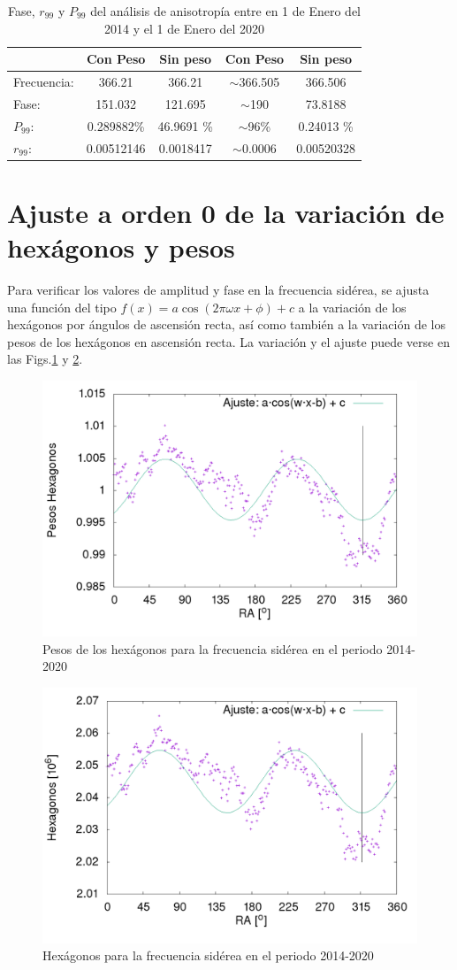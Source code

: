\begin{table}[H]
\centering
\begin{tabular}{l|c|c|c|c}
				& Con Peso 		& Sin peso 		& Con Peso 		& Sin peso 		\\ \hline
Frecuencia:		& 366.21 		& 366.21 		& $\sim$366.505 & 366.506 		\\
Fase:			& 151.032 		& 121.695		& $\sim$190 	& 73.8188		\\
$P_{99}$:		& 0.289882\%	& 46.9691 \% 	& $\sim$96\%	& 0.24013 \% 	\\
$r_{99}$:		& 0.00512146	& 0.0018417		& $\sim$0.0006	& 0.00520328	\\
\end{tabular}
\caption{Fase, $r_{99}$ y $P_{99}$ del análisis de anisotropía entre en 1 de Enero del 2014 y el 1 de Enero del 2020}
\label{tabla:pico}
\end{table}


\section{Ajuste a orden 0 de la variación de hexágonos y pesos}

Para verificar los valores de amplitud y fase en la frecuencia sidérea, se ajusta una función del tipo $f(x) = a\cos{(2\pi\omega x + \phi)} +c$ a la variación de los hexágonos por ángulos de ascensión recta, así como también a la variación de los pesos de los hexágonos en ascensión recta. La variación y el ajuste puede verse en las Figs.\ref{fig:pesos_ajuste} y \ref{fig:pesos_hexagonos}.

\begin{figure}[H]
	\centering
	\includegraphics[width=0.5\linewidth]{ajuste_pesos.png}
	\caption{Pesos de los hexágonos para la frecuencia sidérea en el periodo 2014-2020}
	\label{fig:pesos_ajuste}
\end{figure}


\begin{figure}[H]
	\centering
	\includegraphics[width=0.5\linewidth]{ajuste_hexagonos.png}
	\caption{Hexágonos para la frecuencia sidérea en el periodo 2014-2020}
	\label{fig:pesos_hexagonos}
\end{figure}


